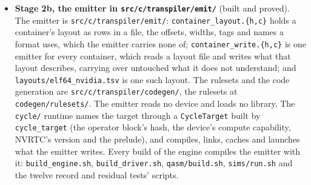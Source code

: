 \begin{enumerate}
\begin{itemize}
\begin{enumerate}
\begin{itemize}
\begin{itemize}
\end{itemize}
\item \textbf{Stage 2b, the emitter in \texttt{src/\allowbreak{}c/\allowbreak{}transpiler/\allowbreak{}emit/\allowbreak{}}} (built and proved). The emitter is \texttt{src/\allowbreak{}c/\allowbreak{}transpiler/\allowbreak{}emit/\allowbreak{}}: \texttt{container\_\allowbreak{}layout.\allowbreak{}\{h,c\}} holds a container's layout as rows in a file, the offsets, widths, tags and names a format uses, which the emitter carries none of; \texttt{container\_\allowbreak{}write.\allowbreak{}\{h,c\}} is one emitter for every container, which reads a layout file and writes what that layout describes, carrying over untouched what it does not understand; and \texttt{layouts/\allowbreak{}elf64\_\allowbreak{}nvidia.\allowbreak{}tsv} is one such layout. The rulesets and the code generation are \texttt{src/\allowbreak{}c/\allowbreak{}transpiler/\allowbreak{}codegen/\allowbreak{}}, the rulesets at \texttt{codegen/\allowbreak{}rulesets/\allowbreak{}}. The emitter reads no device and loads no library. The \texttt{cycle/\allowbreak{}} runtime names the target through a \texttt{Cycle\allowbreak{}Target} built by \texttt{cycle\_\allowbreak{}target} (the operator block's hash, the device's compute capability, NVRTC's version and the prelude), and compiles, links, caches and launches what the emitter writes. Every build of the engine compiles the emitter with it: \texttt{build\_\allowbreak{}engine.\allowbreak{}sh}, \texttt{build\_\allowbreak{}driver.\allowbreak{}sh}, \texttt{qasm/\allowbreak{}build.\allowbreak{}sh}, \texttt{sims/\allowbreak{}run.\allowbreak{}sh} and the twelve record and residual tests' scripts.


\end{itemize}
\end{enumerate}
\end{itemize}
\end{enumerate}

